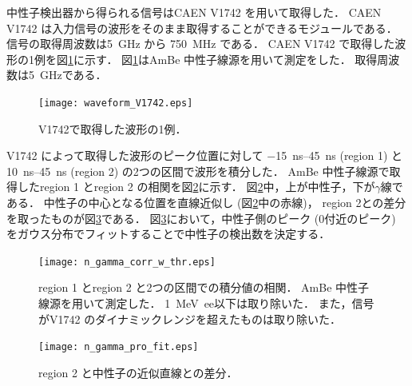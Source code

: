\documentclass[../master]{subfiles}
\begin{document}
中性子検出器から得られる信号はCAEN V1742 を用いて取得した．
CAEN V1742 は入力信号の波形をそのまま取得することができるモジュールである．
信号の取得周波数は\SI{5}{\giga\hertz} から \SI{750}{\mega\hertz} である．
CAEN V1742 で取得した波形の1例を図\ref{fig::waveform_V1742}に示す．
図\ref{fig::waveform_V1742}はAmBe 中性子線源を用いて測定をした．
取得周波数は\SI{5}{\giga\hertz}である．
\begin{figure}
  \centering
  \texttt{[image: waveform\_V1742.eps]}
  \caption{V1742で取得した波形の1例．}
  \label{fig::waveform_V1742}
\end{figure}

V1742 によって取得した波形のピーク位置に対して
\SIrange{-15}{45}{\nano\second} (region 1) と\SIrange{10}{45}{\nano\second} (region 2) の2つの区間で波形を積分した．
AmBe 中性子線源で取得したregion 1 とregion 2 の相関を図\ref{fig::n_gamma_correlation}に示す．
図\ref{fig::n_gamma_correlation}中，上が中性子，下が$\gamma$線である．
中性子の中心となる位置を直線近似し (図\ref{fig::n_gamma_correlation}中の赤線)，
region 2との差分を取ったものが図\ref{fig::n_gamma_projection}である．
図\ref{fig::n_gamma_projection}において，中性子側のピーク (0付近のピーク)
をガウス分布でフィットすることで中性子の検出数を決定する．
\begin{figure}
  \centering
  \texttt{[image: n\_gamma\_corr\_w\_thr.eps]}
  \caption[region 1 とregion 2 と2つの区間での積分値の相関．]
          {region 1 とregion 2 と2つの区間での積分値の相関．
            AmBe 中性子線源を用いて測定した．
            \SI{1}{\mega\electronvolt ee}以下は取り除いた．
            また，信号がV1742 のダイナミックレンジを超えたものは取り除いた．}
  \label{fig::n_gamma_correlation}
\end{figure}
\begin{figure}
  \centering
  \texttt{[image: n\_gamma\_pro\_fit.eps]}
  \caption{region 2 と中性子の近似直線との差分．}
  \label{fig::n_gamma_projection}
\end{figure}

\end{document}
